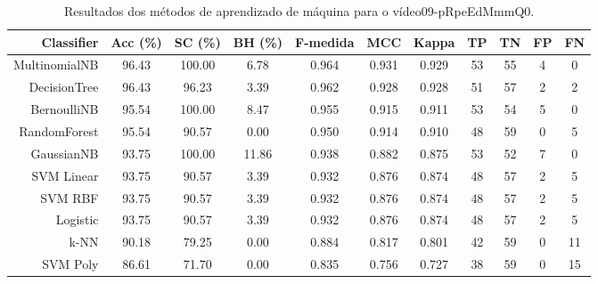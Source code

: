 \begin{table}[!htb]
\centering
\caption{Resultados dos métodos de aprendizado de máquina para o vídeo09-pRpeEdMmmQ0.}
\label{tab:09-pRpeEdMmmQ0}
\begin{tabular}{r|c|c|c|c|c|c|c|c|c|c}
\hline\hline
Classifier & Acc (\%) & SC (\%) & BH (\%) & F-medida & MCC & Kappa & TP & TN & FP & FN \\ \hline
MultinomialNB & 96.43 & 100.00 & 6.78 & 0.964 & 0.931 & 0.929 & 53 & 55 & 4 & 0 \\ 
DecisionTree & 96.43 & 96.23 & 3.39 & 0.962 & 0.928 & 0.928 & 51 & 57 & 2 & 2 \\ 
BernoulliNB & 95.54 & 100.00 & 8.47 & 0.955 & 0.915 & 0.911 & 53 & 54 & 5 & 0 \\ 
RandomForest & 95.54 & 90.57 & 0.00 & 0.950 & 0.914 & 0.910 & 48 & 59 & 0 & 5 \\ 
GaussianNB & 93.75 & 100.00 & 11.86 & 0.938 & 0.882 & 0.875 & 53 & 52 & 7 & 0 \\ 
SVM Linear & 93.75 & 90.57 & 3.39 & 0.932 & 0.876 & 0.874 & 48 & 57 & 2 & 5 \\ 
SVM RBF & 93.75 & 90.57 & 3.39 & 0.932 & 0.876 & 0.874 & 48 & 57 & 2 & 5 \\ 
Logistic & 93.75 & 90.57 & 3.39 & 0.932 & 0.876 & 0.874 & 48 & 57 & 2 & 5 \\ 
k-NN & 90.18 & 79.25 & 0.00 & 0.884 & 0.817 & 0.801 & 42 & 59 & 0 & 11 \\ 
SVM Poly & 86.61 & 71.70 & 0.00 & 0.835 & 0.756 & 0.727 & 38 & 59 & 0 & 15 \\ 
\hline\hline
\end{tabular}
\end{table}
